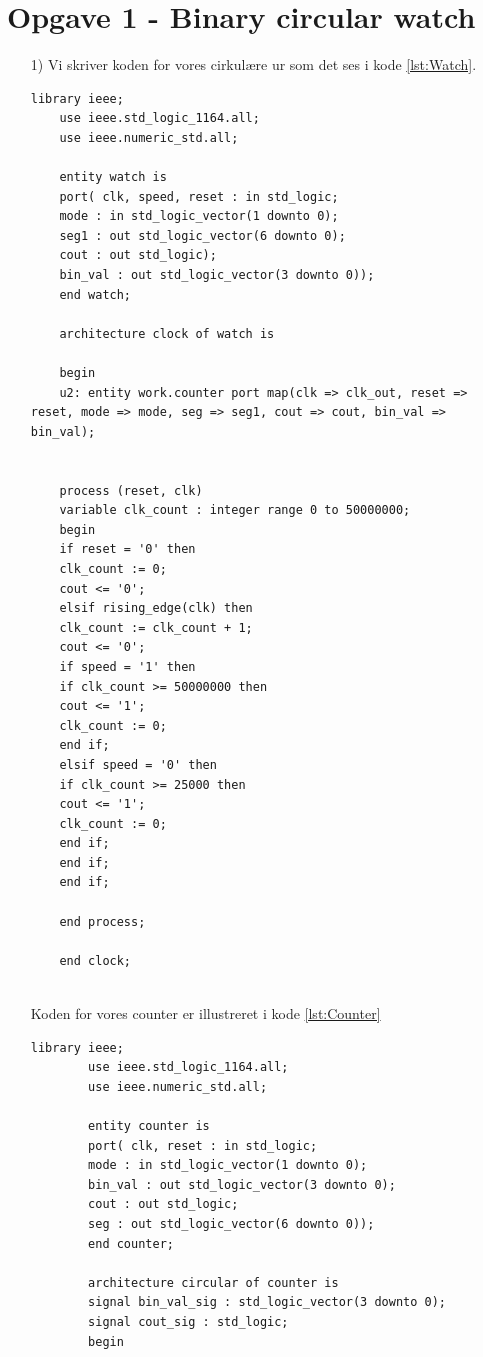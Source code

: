 \section{Opgave 1 - Binary circular watch}
\begin{enumerate}
	\item[1)]
	Vi skriver koden for vores cirkulære ur som det ses i kode \ref{lst:Watch}.\\
	\begin{lstlisting}[caption={VHDL code for binary circular watch},label={lst:Watch}]
	library ieee;
	use ieee.std_logic_1164.all;
	use ieee.numeric_std.all;
	
	entity watch is
	port( clk, speed, reset : in std_logic;
	mode : in std_logic_vector(1 downto 0);
	seg1 : out std_logic_vector(6 downto 0);
	cout : out std_logic);
	bin_val : out std_logic_vector(3 downto 0));
	end watch;
	
	architecture clock of watch is
	
	begin
	u2: entity work.counter port map(clk => clk_out, reset => reset, mode => mode, seg => seg1, cout => cout, bin_val => bin_val);
	
	
	process (reset, clk)
	variable clk_count : integer range 0 to 50000000;
	begin
	if reset = '0' then
	clk_count := 0;
	cout <= '0';
	elsif rising_edge(clk) then
	clk_count := clk_count + 1;
	cout <= '0';
	if speed = '1' then
	if clk_count >= 50000000 then
	cout <= '1';
	clk_count := 0;
	end if;
	elsif speed = '0' then
	if clk_count >= 25000 then
	cout <= '1';
	clk_count := 0;
	end if;
	end if;
	end if;
	
	end process;
	
	end clock;
	
	\end{lstlisting}
	
	Koden for vores counter er illustreret i kode \ref{lst:Counter}
	
		\begin{lstlisting}[caption={VHDL code for binary circular counter},label={lst:Counter}]
		library ieee;
		use ieee.std_logic_1164.all;
		use ieee.numeric_std.all;
		
		entity counter is
		port( clk, reset : in std_logic;
		mode : in std_logic_vector(1 downto 0);
		bin_val : out std_logic_vector(3 downto 0);
		cout : out std_logic;
		seg : out std_logic_vector(6 downto 0));	
		end counter;
		
		architecture circular of counter is
		signal bin_val_sig : std_logic_vector(3 downto 0);
		signal cout_sig : std_logic;
		begin
		

\end{lstlisting}
\end{enumerate}
